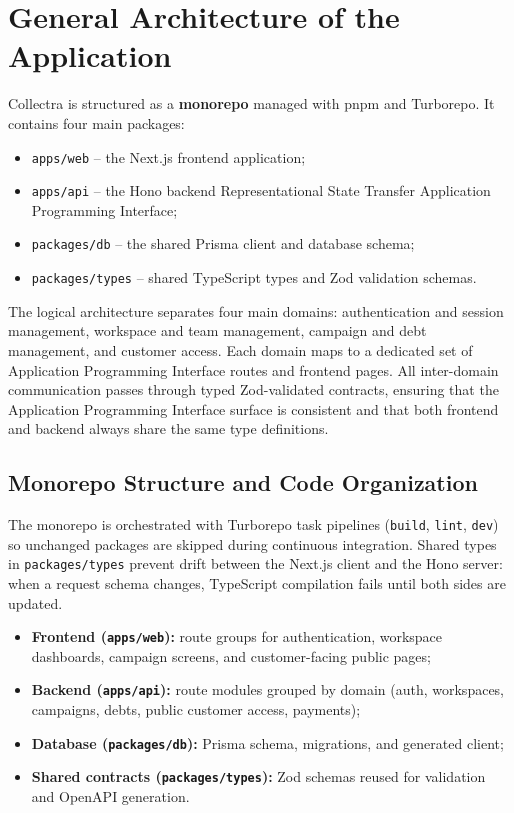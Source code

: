 ﻿\documentclass[12pt,a4paper]{report}
\begin{document}
\section{General Architecture of the Application}

Collectra is structured as a \textbf{monorepo} managed with pnpm and Turborepo.
It contains four main packages:
\begin{itemize}
  \item \texttt{apps/web} -- the Next.js frontend application;
  \item \texttt{apps/api} -- the Hono backend Representational State Transfer Application Programming Interface;
  \item \texttt{packages/db} -- the shared Prisma client and database schema;
  \item \texttt{packages/types} -- shared TypeScript types and Zod validation schemas.
\end{itemize}

The logical architecture separates four main domains: authentication and session
management, workspace and team management, campaign and debt management, and customer
access.
Each domain maps to a dedicated set of Application Programming Interface routes and frontend pages.
All inter-domain communication passes through typed Zod-validated contracts, ensuring
that the Application Programming Interface surface is consistent and that both frontend and
backend always share the same type definitions.

\subsection{Monorepo Structure and Code Organization}

The monorepo is orchestrated with Turborepo task pipelines (\texttt{build}, \texttt{lint},
\texttt{dev}) so unchanged packages are skipped during continuous integration.
Shared types in \texttt{packages/types} prevent drift between the Next.js client and the Hono
server: when a request schema changes, TypeScript compilation fails until both sides are updated.

\begin{itemize}
  \item \textbf{Frontend (\texttt{apps/web}):} route groups for authentication, workspace
        dashboards, campaign screens, and customer-facing public pages;
  \item \textbf{Backend (\texttt{apps/api}):} route modules grouped by domain (auth, workspaces,
        campaigns, debts, public customer access, payments);
  \item \textbf{Database (\texttt{packages/db}):} Prisma schema, migrations, and generated client;
  \item \textbf{Shared contracts (\texttt{packages/types}):} Zod schemas reused for validation and
        OpenAPI generation.
\end{itemize}
\end{document}
